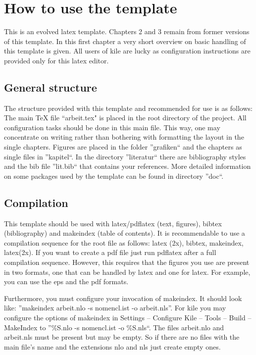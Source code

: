 \chapter{How to use the template}
\label{chap:howto}

This is an evolved latex template. Chapters 2 and 3 remain from former versions of this template. In this first chapter a very short overview on basic handling of this template is given. All users of kile are lucky as configuration instructions are provided only for this latex editor.
\section{General structure}
\label{sec:generalStructure}
The structure provided with this template and recommended for use is as follows: The main TeX file ``arbeit.tex" is placed in the root directory of the project. All configuration tasks should be done in this main file. This way, one may concentrate on writing rather than bothering with formatting the layout in the single chapters. Figures are placed in the folder ''grafiken`` and the chapters as single files in ''kapitel``. In the directory ''literatur`` there are bibliography styles and the bib file ''lit.bib`` that contains your references. More detailed information on some packages used by the template can be found in directory ''doc``. 

\section{Compilation}
\label{sec:compilation}
This template should be used with latex/pdflatex (text, figures), bibtex (bibliography) and makeindex (table of contents). It is recommendable to use a compilation sequence for the root file as follows: latex (2x), bibtex, makeindex, latex(2x). If you want to create a pdf file just run pdflatex after a full compilation sequence. However, this requires that the figures you use are present in two formats, one that can be handled by latex and one for latex. For example, you can use the eps and the pdf formats.

Furthermore, you must configure your invocation of makeindex. It should look like: ''makeindex arbeit.nlo -s nomencl.ist -o arbeit.nls''. For kile you may configure the options of makeindex in Settings -- Configure Kile -- Tools -- Build -- MakeIndex to ''\%S.nlo -s nomencl.ist -o \%S.nls``. The files arbeit.nlo and arbeit.nls must be present but may be empty. So if there are no files with the main file's name and the extensions nlo and nls just create empty ones.

